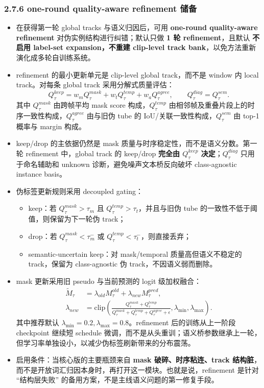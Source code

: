 \documentclass[UTF8]{ctexart}
\begin{document}
\subsubsection*{2.7.6 one-round quality-aware refinement 储备}
\begin{itemize}
\item 在获得第一轮 global tracks 与语义归因后，可用 \textbf{one-round quality-aware refinement} 对伪实例结构进行纠错；默认只做 \textbf{1 轮 refinement}，且默认 \textbf{不启用 label-set expansion，不重建 clip-level track bank}，以免方法重新演化成多轮自训练系统。
\item refinement 的最小更新单元是 clip-level global track，而不是 window 内 local track。对每条 global track 采用分解式质量评估：
\[
 Q_\tau^{keep}=w_m Q_\tau^{mask}+w_t Q_\tau^{temp}+w_a Q_\tau^{agree},\qquad
 Q_\tau^{diag}=Q_\tau^{sem}.
\]
其中 $Q_\tau^{mask}$ 由跨帧平均 mask score 构成，$Q_\tau^{temp}$ 由相邻帧及重叠片段上的时序一致性构成，$Q_\tau^{agree}$ 由与旧伪 tube 的 IoU/关联一致性构成，$Q_\tau^{sem}$ 由 top-1 概率与 margin 构成。
\item keep/drop 的主依据仍然是 mask 质量与时序稳定性，而不是语义分数。第一轮 refinement 中，global track 的 keep/drop \textbf{完全由 $Q_\tau^{keep}$ 决定}；$Q_\tau^{diag}$ 只用于命名辅助和 unknown 诊断，避免噪声文本桥反向破坏 class-agnostic instance basis。
\item 伪标签更新规则采用 decoupled gating：
\begin{itemize}
\item keep：若 $Q_\tau^{mask}>\tau_m$ 且 $Q_\tau^{temp}>\tau_t$，并且与旧伪 tube 的一致性不低于阈值，则保留为下一轮伪 track；
\item drop：若 $Q_\tau^{mask}<\tau_m^{-}$ 或 $Q_\tau^{temp}<\tau_t^{-}$，则直接丢弃；
\item semantic-uncertain keep：对 mask/temporal 质量高但语义不稳定的 track，保留为 class-agnostic 伪 track，不因语义弱而删除。
\end{itemize}
\item mask 更新采用旧 pseudo 与当前预测的 logit 级加权融合：
\[
\begin{aligned}
 \tilde M_\tau &= \lambda_{old} M_\tau^{old}+\lambda_{new} M_\tau^{pred},\\
 \lambda_{new} &= \mathrm{clip}\!\left(
 \frac{Q_\tau^{mask}+Q_\tau^{temp}}{Q_\tau^{mask}+Q_\tau^{temp}+Q_\tau^{agree}+\epsilon}, \lambda_{\min},\lambda_{\max}
 \right).
\end{aligned}
\]
其中推荐默认 $\lambda_{\min}=0.2,\lambda_{\max}=0.8$。refinement 后的训练从上一阶段 checkpoint 继续短 schedule 微调，而不是从头重训；语义桥参数继承上一轮，但学习率单独设小，以减少伪标签刷新带来的分布震荡。
\item 启用条件：当核心版的主要瓶颈来自 \textbf{mask 破碎、时序粘连、track 结构脏}，而不是开放词汇归因本身时，再打开这一模块。也就是说，refinement 是针对 ``结构层失败'' 的备用方案，不是主线语义问题的第一修复手段。
\end{itemize}
\end{document}
